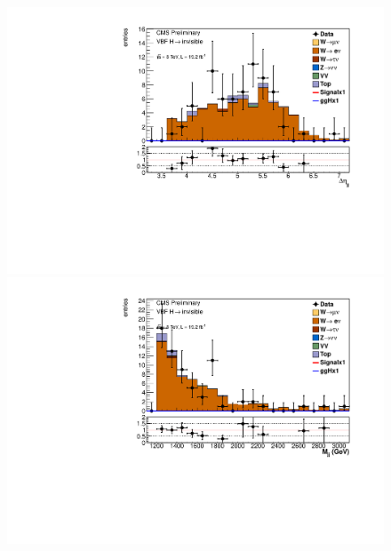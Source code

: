 \begin{figure}
  \includegraphics[width=.6\largefigwidth]{plots/parked/AN-14-243-figs/output_sigreg/enu_dijet_deta.pdf}
  \includegraphics[width=.6\largefigwidth]{plots/parked/AN-14-243-figs/output_sigreg/enu_dijet_M.pdf}


\end{figure}
